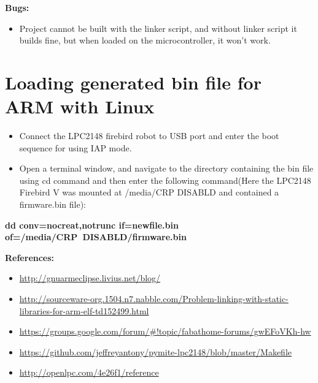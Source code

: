 \documentclass[20pt]{report}
\begin{document}
\textbf{Bugs:}
\begin{itemize}
\item Project cannot be built with the linker script, and without linker script it builds fine, but when loaded on the microcontroller, it won't work.
\end{itemize}


\section{\textbf{Loading generated bin file for ARM with Linux}}
\medskip

\begin{itemize}
\item Connect the LPC2148 firebird robot to USB port and enter the boot sequence for using IAP mode.
\item Open a terminal window, and navigate to the directory containing the bin file using cd command and then enter the following command(Here the LPC2148 Firebird V was mounted at /media/CRP DISABLD and contained a firmware.bin file):
\end{itemize}

\medskip

\textbf{dd conv=nocreat,notrunc if=newfile.bin of=/media/CRP\ DISABLD/firmware.bin}

\medskip
\medskip

\textbf{References:}
\begin{itemize}
\item \url{http://gnuarmeclipse.livius.net/blog/}
\item \url{http://sourceware-org.1504.n7.nabble.com/Problem-linking-with-static-libraries-for-arm-elf-td152499.html}
\item \url{https://groups.google.com/forum/#!topic/fabathome-forums/gwEFoVKh-hw}
\item \url{https://github.com/jeffreyantony/pymite-lpc2148/blob/master/Makefile}
\item \url{http://openlpc.com/4e26f1/reference}
\end{itemize}
\end{document}

